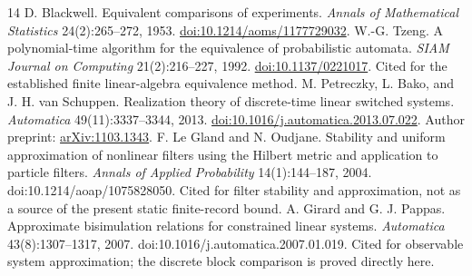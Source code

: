 \documentclass[11pt,oneside,openany]{book}
\numberwithin{equation}{section}
\begin{document}
\begin{thebibliography}{14}
 D. Blackwell. Equivalent comparisons of experiments. \emph{Annals of Mathematical Statistics} 24(2):265--272, 1953. \href{https://doi.org/10.1214/aoms/1177729032}{doi:10.1214/aoms/1177729032}.
 W.-G. Tzeng. A polynomial-time algorithm for the equivalence of probabilistic automata. \emph{SIAM Journal on Computing} 21(2):216--227, 1992. \href{https://doi.org/10.1137/0221017}{doi:10.1137/0221017}. Cited for the established finite linear-algebra equivalence method.
 M. Petreczky, L. Bako, and J. H. van Schuppen. Realization theory of discrete-time linear switched systems. \emph{Automatica} 49(11):3337--3344, 2013. \href{https://doi.org/10.1016/j.automatica.2013.07.022}{doi:10.1016/j.automatica.2013.07.022}. Author preprint: \href{https://arxiv.org/abs/1103.1343}{arXiv:1103.1343}.
 F. Le Gland and N. Oudjane. Stability and uniform approximation of nonlinear filters using the Hilbert metric and application to particle filters. \emph{Annals of Applied Probability} 14(1):144--187, 2004. doi:10.1214/aoap/1075828050. Cited for filter stability and approximation, not as a source of the present static finite-record bound.
 A. Girard and G. J. Pappas. Approximate bisimulation relations for constrained linear systems. \emph{Automatica} 43(8):1307--1317, 2007. doi:10.1016/j.automatica.2007.01.019. Cited for observable system approximation; the discrete block comparison is proved directly here.
\end{thebibliography}
\end{document}
